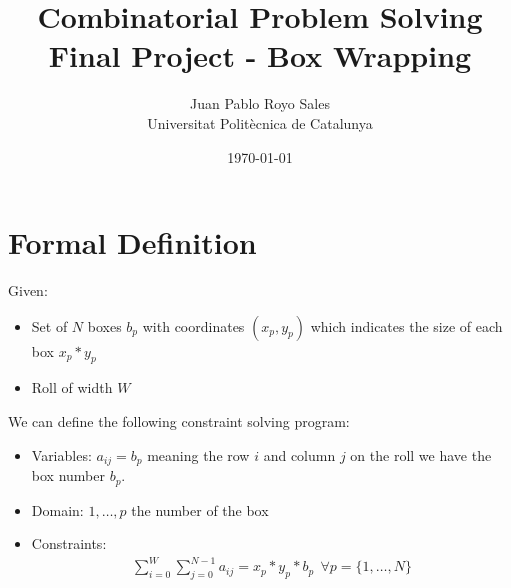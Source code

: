\documentclass[12pt, a4paper]{article}
\title{%
      Combinatorial Problem Solving \\
      Final Project - Box Wrapping
}
\author{%
  Juan Pablo Royo Sales \\
  \small{Universitat Politècnica de Catalunya}
}
\date\today
\begin{document}
\maketitle

\section{Formal Definition}
Given:


\begin{itemize}
  \item Set of $N$ boxes $b_p$ with coordinates $(x_p, y_p)$ which indicates the size of each box $x_p * y_p$
  \item Roll of width $W$
\end{itemize}

We can define the following constraint solving program:

\begin{itemize}
  \item Variables: $a_{ij} = b_p$ meaning the row $i$ and column $j$ on the roll we have the box number $b_p$.
  \item Domain: ${1,\dots,p}$ the number of the box
  \item Constraints:
    \begin{subequations}
      \begin{align}
        \sum_{i=0}^W\sum_{j=0}^{N-1} a_{ij} = x_p * y_p * b_p \ \ \forall p=\{1,\dots,N\}
    \end{align}
    \end{subequations}
\end{itemize}
\end{document}
